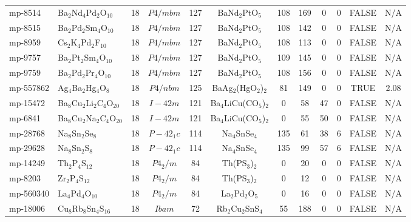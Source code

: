 {\begin{longtable}{llcccccccccc}
    mp-8514 & Ba$_{2}$Nd$_{4}$Pd$_{2}$O$_{10}$ & 18    & $P4/mbm$ & 127   & BaNd$_{2}$PtO$_{5}$ & 108   & 169   & 0     & 0     & FALSE & N/A \\
    mp-8515 & Ba$_{2}$Pd$_{2}$Sm$_{4}$O$_{10}$ & 18    & $P4/mbm$ & 127   & BaNd$_{2}$PtO$_{5}$ & 108   & 142   & 0     & 0     & FALSE & N/A \\
    mp-8959 & Cs$_{2}$K$_{4}$Pd$_{2}$F$_{10}$ & 18    & $P4/mbm$ & 127   & BaNd$_{2}$PtO$_{5}$ & 108   & 113   & 0     & 0     & FALSE & N/A \\
    mp-9757 & Ba$_{2}$Pt$_{2}$Sm$_{4}$O$_{10}$ & 18    & $P4/mbm$ & 127   & BaNd$_{2}$PtO$_{5}$ & 109   & 145   & 0     & 0     & FALSE & N/A \\
    mp-9759 & Ba$_{2}$Pd$_{2}$Pr$_{4}$O$_{10}$ & 18    & $P4/mbm$ & 127   & BaNd$_{2}$PtO$_{5}$ & 108   & 156   & 0     & 0     & FALSE & N/A \\
    mp-557862 & Ag$_{4}$Ba$_{2}$Hg$_{4}$O$_{8}$ & 18    & $P4/nbm$ & 125   & BaAg$_{2}$(HgO$_{2}$)$_{2}$ & 81    & 149   & 0     & 0     & TRUE  & 2.08  \\
    mp-15472 & Ba$_{8}$Cu$_{2}$Li$_{2}$C$_{4}$O$_{20}$ & 18    & $I-42m$ & 121   & Ba$_{4}$LiCu(CO$_{5}$)$_{2}$ & 0     & 58    & 47    & 0     & FALSE & N/A \\
    mp-6841 & Ba$_{8}$Cu$_{2}$Na$_{2}$C$_{4}$O$_{20}$ & 18    & $I-42m$ & 121   & Ba$_{4}$LiCu(CO$_{5}$)$_{2}$ & 0     & 55    & 50    & 0     & FALSE & N/A \\
    mp-28768 & Na$_{8}$Sn$_{2}$Se$_{8}$ & 18    & $P-42_1c$ & 114   & Na$_{4}$SnSe$_{4}$ & 135   & 61    & 38    & 6     & FALSE & N/A \\
    mp-29628 & Na$_{8}$Sn$_{2}$S$_{8}$ & 18    & $P-42_1c$ & 114   & Na$_{4}$SnSe$_{4}$ & 135   & 99    & 57    & 6     & FALSE & N/A \\
    mp-14249 & Th$_{2}$P$_{4}$S$_{12}$ & 18    & $P4_2/m$ & 84    & Th(PS$_{3}$)$_{2}$ & 0     & 20    & 0     & 0     & FALSE & N/A \\
    mp-8203 & Zr$_{2}$P$_{4}$S$_{12}$ & 18    & $P4_2/m$ & 84    & Th(PS$_{3}$)$_{2}$ & 0     & 12    & 0     & 0     & FALSE & N/A \\
    mp-560340 & La$_{4}$Pd$_{4}$O$_{10}$ & 18    & $P4_2/m$ & 84    & La$_{2}$Pd$_{2}$O$_{5}$ & 0     & 16    & 0     & 0     & FALSE & N/A \\
    mp-18006 & Cu$_{8}$Rb$_{8}$Sn$_{4}$S$_{16}$ & 18    & $Ibam$ & 72    & Rb$_{2}$Cu$_{2}$SnS$_{4}$ & 55    & 188   & 0     & 0     & FALSE & N/A \\

\end{longtable}}
